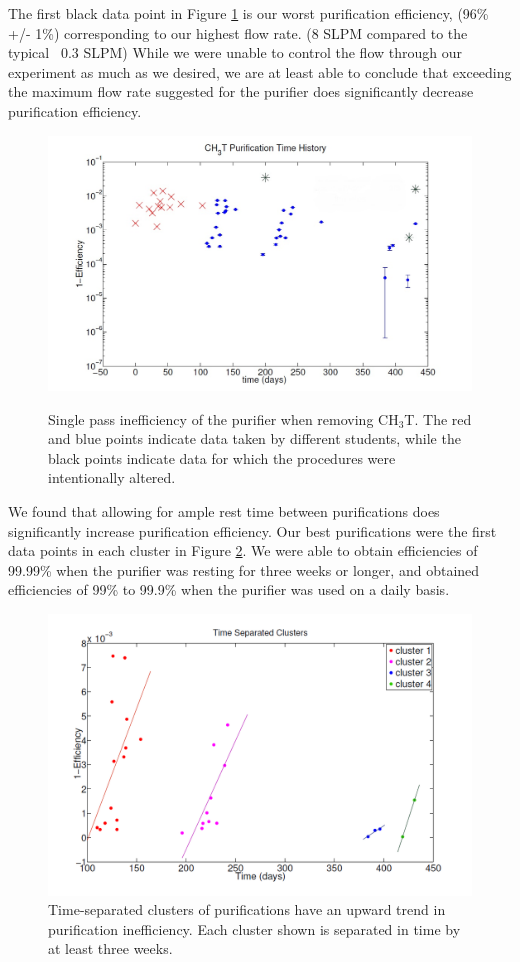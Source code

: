 The first black data point in Figure \ref{fig:InEff} is our worst purification efficiency, (96\% +/- 1\%) corresponding to our highest flow rate. (8 SLPM compared to the typical ~0.3 SLPM)  While we were unable to control the flow through our experiment as much as we desired, we are at least able to conclude that exceeding the maximum flow rate suggested for the purifier does significantly decrease purification efficiency.


\begin{figure}[H]
\caption{Single pass inefficiency of the purifier when removing CH$_3$T.  The red and blue points indicate data taken by different students, while the black points indicate data for which the procedures were intentionally altered. }
\centering
\includegraphics[scale=0.2]{Figone.png}
\label{fig:InEff}
\end{figure}


We found that allowing for ample rest time between purifications does significantly increase purification efficiency. Our best purifications were the first data points in each cluster in Figure \ref{fig:Clusters}.  We were able to obtain efficiencies of 99.99\% when the purifier was resting for three weeks or longer, and obtained efficiencies of 99\% to 99.9\% when the purifier was used on a daily basis.

\begin{figure}[H]
\centering
\includegraphics[scale=0.2]{Figfour.png}
\caption{Time-separated clusters of purifications have an upward trend in purification inefficiency.  Each cluster shown is separated in time by at least three weeks.}
\label{fig:Clusters}
\end{figure}

